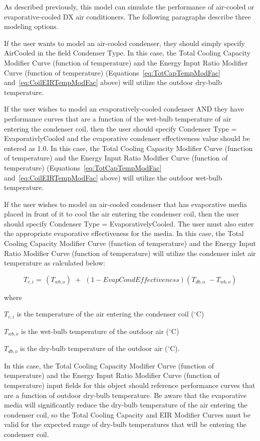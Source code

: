 As described previously, this model can simulate the performance of air-cooled or evaporative-cooled DX air conditioners. The following paragraphs describe three modeling options.

If the user wants to model an air-cooled condenser, they should simply specify AirCooled in the field Condenser Type. In this case, the Total Cooling Capacity Modifier Curve (function of temperature) and the Energy Input Ratio Modifier Curve (function of temperature) (Equations~\ref{eq:TotCapTempModFac} and~\ref{eq:CoilEIRTempModFac} above) will utilize the outdoor dry-bulb temperature.

If the user wishes to model an evaporatively-cooled condenser AND they have performance curves that are a function of the wet-bulb temperature of air entering the condenser coil, then the user should specify Condenser Type = EvaporativlyCooled and the evaporative condenser effectiveness value should be entered as 1.0. In this case, the Total Cooling Capacity Modifier Curve (function of temperature) and the Energy Input Ratio Modifier Curve (function of temperature) (Equations~\ref{eq:TotCapTempModFac} and~\ref{eq:CoilEIRTempModFac} above) will utilize the outdoor wet-bulb temperature.

If the user wishes to model an air-cooled condenser that has evaporative media placed in front of it to cool the air entering the condenser coil, then the user should specify Condenser Type = EvaporativelyCooled. The user must also enter the appropriate evaporative effectiveness for the media. In this case, the Total Cooling Capacity Modifier Curve (function of temperature) and the Energy Input Ratio Modifier Curve (function of temperature) will utilize the condenser inlet air temperature as calculated below:

\begin{equation}
{T_{c,i}} = \,\left( {{T_{wb,o}}} \right)\,\, + \,\,\left( {1 - EvapCondEffectiveness} \right)\left( {{T_{db,o}}\,\, - {T_{wb,o}}} \right)
\end{equation}

where

\(T_{c,i}\) is the temperature of the air entering the condenser coil (\(^{\circ}\)C)

\(T_{wb,o}\) is the wet-bulb temperature of the outdoor air (\(^{\circ}\)C)

\(T_{db,o}\) is the dry-bulb temperature of the outdoor air (\(^{\circ}\)C).

In this case, the Total Cooling Capacity Modifier Curve (function of temperature) and the Energy Input Ratio Modifier Curve (function of temperature) input fields for this object should reference performance curves that are a function of outdoor dry-bulb temperature. Be aware that the evaporative media will significantly reduce the dry-bulb temperature of the air entering the condenser coil, so the Total Cooling Capacity and EIR Modifier Curves must be valid for the expected range of dry-bulb temperatures that will be entering the condenser coil.

